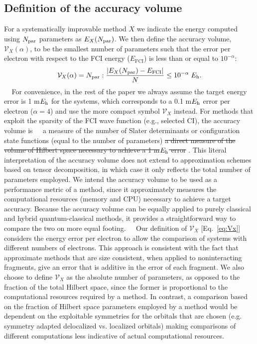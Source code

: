 \documentclass[aip,jcp,amsmath,amssymb, preprint]{revtex4-1}
\newcommand*{\Eh}{$E_{\rm h}$\xspace}
\newcommand*{\ncomp}{\mathcal{V}_X}
\newcommand{\add}[1]{\colorbox{goodgreen}{\textcolor{white}{\footnotesize  \fontfamily{phv}\selectfont +}}
    \textcolor{goodgreen}{{#1}}\xspace}
\newcommand{\remove}[1]{
\colorbox{goodred}{\textcolor{white}{\footnotesize  \fontfamily{phv}\selectfont \textminus\vphantom{c}}}
\textcolor{goodred}{\sout{#1}}\xspace
}
\begin{document}
\subsection{Definition of the accuracy volume}
For a systematically improvable method $X$ we indicate the energy computed using $N_{\rm{par}}$  parameters as $E_X(N_{\rm{par}})$. We then define the accuracy volume, $\ncomp(\alpha)$, to be the smallest number of parameters such that the error per electron with respect to the FCI energy ($E_\mathrm{FCI}$) is less than or equal to $10^{-\alpha}$:
\begin{equation}
\label{eq:Vx}
\ncomp(\alpha) = N_{\rm{par}} : \frac{ |E_X(N_{\rm{par}}) - E_\mathrm{FCI}|}{N} \leq  10^{-\alpha}  \; E_\mathrm{h}.
\end{equation}
\add{For convenience, in the rest of the paper we always assume the target energy error is 1 m\Eh for the \ce{H10} systems, which corresponds to a 0.1 m\Eh error per electron  ($\alpha = 4$) and use the more compact symbol $\ncomp$ instead.}
For methods that exploit the sparsity of the FCI wave function (e.g., selected CI), the accuracy volume is \add{a measure of the number of Slater determinants or configuration state functions (equal to the number of parameters)} \remove{a direct measure of the volume of Hilbert space necessary to achieve a 1 m\Eh error}.
This literal interpretation of the accuracy volume does not extend to approximation schemes based on tensor decomposition, in which case it only reflects the total number of parameters employed. 
We intend the accuracy volume to be used as a performance metric of a method, since it approximately measures the computational resources (memory and CPU) necessary to achieve a target accuracy.
Because the accuracy volume can be equally applied to purely classical and hybrid quantum-classical methods, it provides a straightforward way to compare the two on more equal footing.
\add{Our definition of  $\ncomp$ [Eq.~\eqref{eq:Vx}] considers the energy error per electron to allow the comparison of systems with different numbers of electrons.
This approach is consistent with the fact that approximate methods that are size consistent, when applied to noninteracting fragments, give an error that is additive in the error of each fragment.}
We also choose to define $\ncomp$ as the absolute number of parameters, as opposed to the fraction of the total Hilbert space, since the former is proportional to the computational resources required by a method.
In contrast, a comparison based on the fraction of Hilbert space parameters employed by a method would be dependent on the exploitable symmetries for the orbitals that are chosen (e.g. symmetry adapted delocalized vs. localized orbitals) making comparisons of different computations less indicative of actual computational resources.
\end{document}
